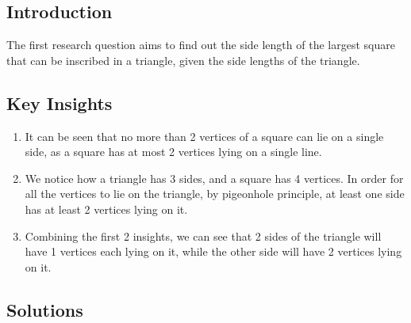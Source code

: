 \documentclass[12pt]{scrartcl}
\begin{document}
\subsection{Introduction}
The first research question aims to find out the side length of the largest square that can be inscribed in a triangle, given the side lengths of the triangle.

\subsection{Key Insights}
\begin{enumerate}
	\item It can be seen that no more than 2 vertices of a square can lie on a single side, as a square has at most 2 vertices lying on a single line.
	\item We notice how a triangle has 3 sides, and a square has 4 vertices. In order for all the vertices to lie on the triangle, by pigeonhole principle, at least one side has at least 2 vertices lying on it.
	\item Combining the first 2 insights, we can see that 2 sides of the triangle will have 1 vertices each lying on it, while the other side will have 2 vertices lying on it.
\end{enumerate}

\subsection{Solutions}
\end{document}
